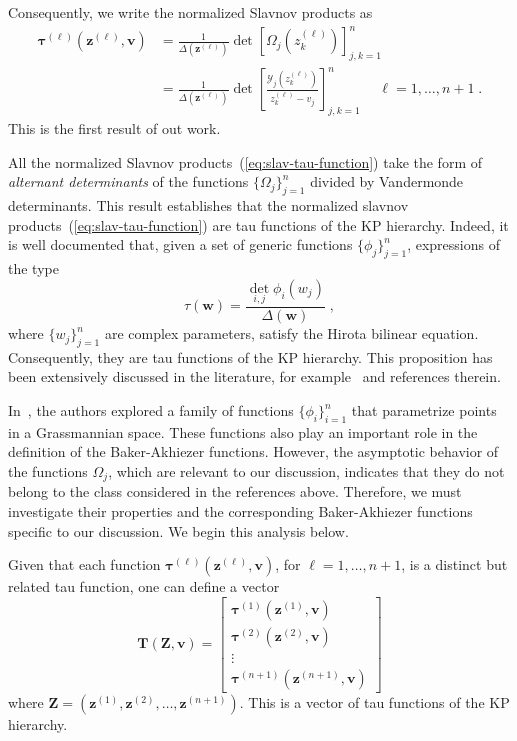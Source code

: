 \documentclass[a4paper,12pt]{amsart}
\begin{document}
Consequently, we write the normalized Slavnov products as 
\begin{equation}
\begin{split}
\label{eq:slav-tau-function}
  \bm{\tau}^{(\ell)}(\bm{z}^{(\ell)}, \bm{v})
  & = \frac{1}{\Delta(\bm{z^{(\ell)}})} \det[\Omega_j(z^{(\ell)}_k) ]_{j,k=1}^n \\
  & = \frac{1}{\Delta(\bm{z}^{(\ell)})} \det\left[\frac{\mathcal{Y}_j(z^{(\ell)}_k)}{z^{(\ell)}_k - v_j} \right]_{j,k=1}^n
  \; \quad \ell = 1, \dots, n+1 \; .
\end{split}
\end{equation}
This is the first result of out work. 

All the normalized Slavnov products~(\ref{eq:slav-tau-function}) take
the form of \emph{alternant determinants} of the functions
\(\{\Omega_j\}_{j=1}^n\) divided by Vandermonde determinants.  This
result establishes that the normalized slavnov
products~(\ref{eq:slav-tau-function}) are tau functions of the KP
hierarchy. Indeed, it is well documented that, given a set of generic
functions \(\{\phi_j\}_{j=1}^n\), expressions of the type
\begin{equation}
\tau(\bm{w}) =
\frac{\det_{i,j} \phi_i(w_j)}{\Delta(\bm{w})}\; ,
\end{equation}
where \(\{w_j\}_{j=1}^n\) are complex parameters, satisfy the Hirota
bilinear equation. Consequently, they are tau functions of the KP
hierarchy.  This proposition has been extensively discussed in the
literature, for example~\cite{Segal:1985aga, Kharchev:1991cy,
  Araujo:2021ghu} and references therein.

In~\cite{Segal:1985aga, Kharchev:1991cy, Alexandrov:2014cwa}, the
authors explored a family of functions \(\{ \phi_i\}_{i=1}^n\) that
parametrize points in a Grassmannian space. These functions also play
an important role in the definition of the Baker-Akhiezer
functions. However, the asymptotic behavior of the functions
\(\Omega_j\), which are relevant to our discussion, indicates that
they do not belong to the class considered in the references above.
Therefore, we must investigate their properties and the corresponding
Baker-Akhiezer functions specific to our discussion.  We begin this
analysis below.

Given that each function \(\bm{\tau}^{(\ell)}(\bm{z}^{(\ell)}, \bm{v})\), for
\(\ell = 1, \dots, n+1\), is a distinct but related tau function, one
can define a vector
\begin{equation}
  \bm{T}(\bm{Z}, \bm{v}) = 
\begin{bmatrix}
\bm{\tau}^{(1)}(\bm{z}^{(1)}, \bm{v}) \\ 
\bm{\tau}^{(2)}(\bm{z}^{(2)}, \bm{v}) \\ 
\vdots \\ 
\bm{\tau}^{(n+1)}(\bm{z}^{(n+1)}, \bm{v})
\end{bmatrix}
\end{equation}
where \(\bm{Z} = (\bm{z}^{(1)}, \bm{z}^{(2)}, \dots,
\bm{z}^{(n+1)})\). This is a vector of tau functions of the KP
hierarchy.
\end{document}
